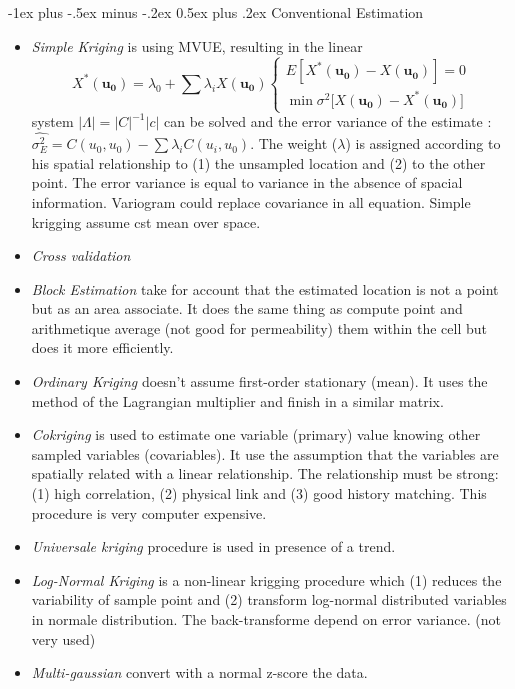 \documentclass[10pt,landscape]{article}
\makeatletter
\renewcommand{\section}{\@startsection{section}{1}{0mm}%
                                {-1ex plus -.5ex minus -.2ex}%
                                {0.5ex plus .2ex}%
                                {\normalfont\large\bfseries}}
\makeatother
\begin{document}
\begin{multicols}{3}
\section{Conventional Estimation}
\begin{itemize}
	\item \emph{Simple Kriging} is using MVUE, resulting in the linear
\[X^*(\mathbf{u_0})=\lambda_0 + \sum{\lambda_i X(\mathbf{u_0})} \left\{
  \begin{array}{l}
   E[X^*(\mathbf{u_0})-X(\mathbf{u_0})]=0\\
    \min{ {\sigma^2[X(\mathbf{u_0})-X^*(\mathbf{u_0}) }}]
  \end{array}
\right.\]	
 system $|\Lambda|=|C|^{-1}|c|$ can be solved and the error variance of the estimate : $\hat{\sigma_E^2}=C(u_0,u_0)-\sum{\lambda_i C(u_i,u_0)}$. The weight ($\lambda$) is assigned according to his spatial relationship to (1) the unsampled location and (2) to the other point. The error variance is equal to variance in the absence of spacial information. Variogram could replace covariance in all equation. Simple krigging assume cst mean over space.
	\item \emph{Cross validation} 
	\item \emph{Block Estimation} take for account that the estimated location is not a point but as an area associate. It does the same thing as compute point and arithmetique average (not good for permeability) them within the cell but does it more efficiently.
	\item \emph{Ordinary Kriging} doesn't assume first-order stationary (mean). It uses the method of the Lagrangian multiplier and finish in a similar matrix.
	\item \emph{Cokriging} is used to estimate one variable (primary) value knowing other sampled variables (covariables). It use the assumption that the variables are spatially related with a linear relationship. The relationship must be strong: (1) high correlation, (2) physical link and (3) good history matching. This procedure is very computer expensive.
	\item \emph{Universale kriging} procedure is used in presence of a trend. 
	\item \emph{Log-Normal Kriging} is a non-linear krigging procedure which (1) reduces the variability of sample point and (2) transform log-normal distributed variables in normale distribution. The back-transforme depend on error variance. (not very used)
	\item \emph{Multi-gaussian} convert with a normal z-score the data. 

\end{itemize}
\end{multicols}
\end{document}
